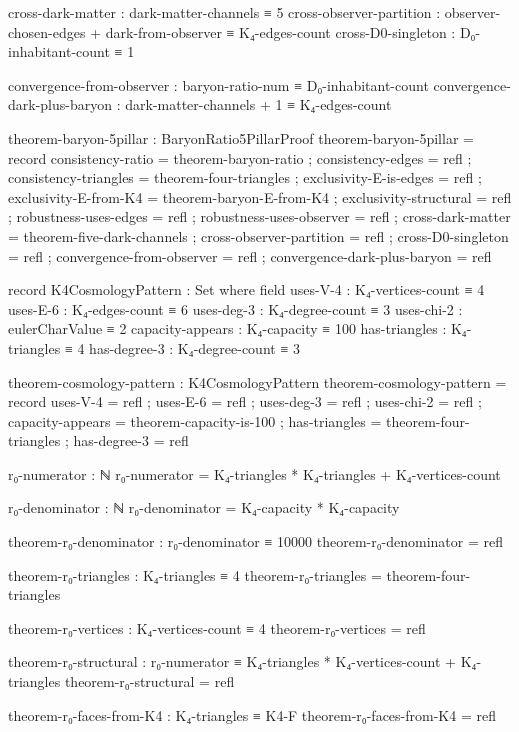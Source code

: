 \documentclass[11pt,a4paper]{book}
\begin{document}
\begin{code}
    cross-dark-matter : dark-matter-channels ≡ 5
    cross-observer-partition : observer-chosen-edges + dark-from-observer ≡ K₄-edges-count
    cross-D0-singleton : D₀-inhabitant-count ≡ 1
    
    convergence-from-observer : baryon-ratio-num ≡ D₀-inhabitant-count
    convergence-dark-plus-baryon : dark-matter-channels + 1 ≡ K₄-edges-count

theorem-baryon-5pillar : BaryonRatio5PillarProof
theorem-baryon-5pillar = record
  { consistency-ratio = theorem-baryon-ratio
  ; consistency-edges = refl
  ; consistency-triangles = theorem-four-triangles
  ; exclusivity-E-is-edges = refl
  ; exclusivity-E-from-K4 = theorem-baryon-E-from-K4
  ; exclusivity-structural = refl
  ; robustness-uses-edges = refl
  ; robustness-uses-observer = refl
  ; cross-dark-matter = theorem-five-dark-channels
  ; cross-observer-partition = refl
  ; cross-D0-singleton = refl
  ; convergence-from-observer = refl
  ; convergence-dark-plus-baryon = refl
  }

record K4CosmologyPattern : Set where
  field
    uses-V-4          : K₄-vertices-count ≡ 4
    uses-E-6          : K₄-edges-count ≡ 6
    uses-deg-3        : K₄-degree-count ≡ 3
    uses-chi-2        : eulerCharValue ≡ 2
    capacity-appears  : K₄-capacity ≡ 100
    has-triangles     : K₄-triangles ≡ 4
    has-degree-3      : K₄-degree-count ≡ 3

theorem-cosmology-pattern : K4CosmologyPattern
theorem-cosmology-pattern = record
  { uses-V-4         = refl
  ; uses-E-6         = refl
  ; uses-deg-3       = refl
  ; uses-chi-2       = refl
  ; capacity-appears = theorem-capacity-is-100
  ; has-triangles    = theorem-four-triangles
  ; has-degree-3     = refl
  }

r₀-numerator : ℕ
r₀-numerator = K₄-triangles * K₄-triangles + K₄-vertices-count


r₀-denominator : ℕ
r₀-denominator = K₄-capacity * K₄-capacity

theorem-r₀-denominator : r₀-denominator ≡ 10000
theorem-r₀-denominator = refl

theorem-r₀-triangles : K₄-triangles ≡ 4
theorem-r₀-triangles = theorem-four-triangles

theorem-r₀-vertices : K₄-vertices-count ≡ 4
theorem-r₀-vertices = refl


theorem-r₀-structural : r₀-numerator ≡ K₄-triangles * K₄-vertices-count + K₄-triangles
theorem-r₀-structural = refl

theorem-r₀-faces-from-K4 : K₄-triangles ≡ K4-F
theorem-r₀-faces-from-K4 = refl



\end{code}
\end{document}
